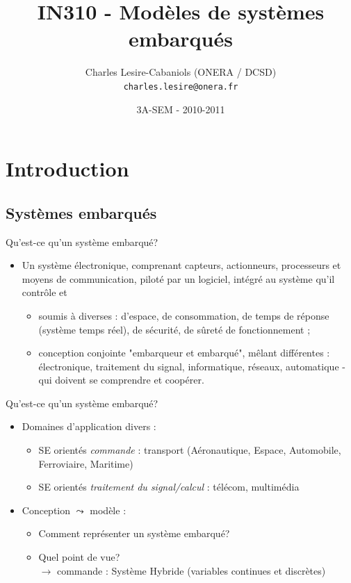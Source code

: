 \documentclass[compress]{beamer}
\title[SEM IN310 - MSE]{IN310 - Modèles de systèmes embarqués}
\author[Charles Lesire]{Charles Lesire-Cabaniols (ONERA / DCSD)\\{\tt charles.lesire@onera.fr}}
\date[2010-2011]{3A-SEM - 2010-2011}
\begin{document}
\begin{frame}
\titlepage
\end{frame}

\begin{frame}
\tableofcontents%
\end{frame}

\section{Introduction}
\subsection{Systèmes embarqués}
\begin{frame}{Qu'est-ce qu'un système embarqué?}
\begin{itemize}
\item Un système électronique, comprenant capteurs, actionneurs, processeurs et moyens de communication, piloté par un logiciel, intégré au système qu'il contrôle et  
	\begin{itemize}
	\item soumis à diverses  : d'espace, de consommation, de temps de réponse ({\footnotesize  système temps réel}), de sécurité, de  sûreté de fonctionnement ;
	\item conception conjointe "embarqueur et embarqué", mêlant différentes    : électronique, traitement du signal, informatique, réseaux, automatique - qui doivent se comprendre et coopérer.
	\end{itemize}
\end{itemize}	
\end{frame}
 
\begin{frame}{Qu'est-ce qu'un système embarqué?}
\begin{itemize}
\item Domaines d'application divers :
	\begin{itemize}
	\item SE orientés {\it commande} : transport (Aéronautique, Espace, Automobile, Ferroviaire, Maritime)
	\item SE orientés {\it traitement du signal/calcul} : télécom, multimédia
	\end{itemize}
\item Conception $\leadsto$ modèle :
	\begin{itemize}
	\item Comment représenter un système embarqué?
	\item Quel point de vue?\\
	$\rightarrow$ commande : Système Hybride (variables continues et discrètes)
	\end{itemize}
\end{itemize}
\end{frame}
\end{document}
